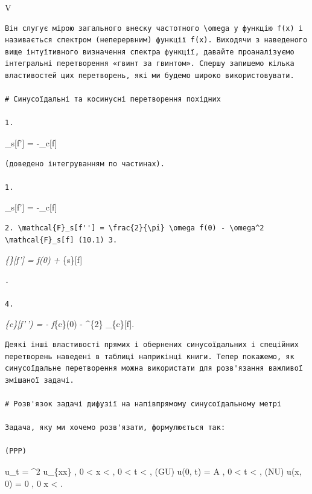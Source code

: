 \documentclass[
  ukrainian,
]{article}
\begin{document}
V 

\begin{verbatim}
Він слугує мірою загального внеску частотного \omega у функцію f(x) і називається спектром (неперервним) функції f(x). Виходячи з наведеного вище інтуїтивного визначення спектра функції, давайте проаналізуємо інтегральні перетворення «гвинт за гвинтом». Спершу запишемо кілька властивостей цих перетворень, які ми будемо широко використовувати.

# Синусоїдальні та косинусні перетворення похідних

1.
\end{verbatim}

\_s{[}f'{]} = -\omega {}\_c{[}f{]}

\begin{verbatim}
(доведено інтегруванням по частинах).

1.
\end{verbatim}

\_s{[}f'{]} = -\omega {}\_c{[}f{]}

\begin{verbatim}
2. \mathcal{F}_s[f''] = \frac{2}{\pi} \omega f(0) - \omega^2 \mathcal{F}_s[f] (10.1) 3.
\end{verbatim}

\emph{\{\rho\}{[}f'{]} =  f(0) +
\omega {}}\{s\}{[}f{]}

\begin{verbatim}
.

4.
\end{verbatim}

\emph{\{c\}{[}f'\,') = - f}\{c\}(0) -
\omega\^{}\{2\} \_\{c\}{[}f{]}.

\begin{verbatim}
Деякі інші властивості прямих і обернених синусоїдальних і спеційних перетворень наведені в таблиці наприкінці книги. Тепер покажемо, як синусоїдальне перетворення можна використати для розв'язання важливої змішаної задачі.

# Розв'язок задачі дифузії на напівпрямому синусоїдальному метрі

Задача, яку ми хочемо розв'язати, формулюється так:

(PPP)
\end{verbatim}

u\_t = \alpha\^{}2 u\_\{xx\} , 0 \textless{} x \textless{} \infty , 0
\textless{} t \textless{} \infty , (GU) u(0, t) = A , 0 \textless{} t
\textless{} \infty , (NU) u(x, 0) = 0 , 0 \le x \textless{} \infty .
\end{document}
